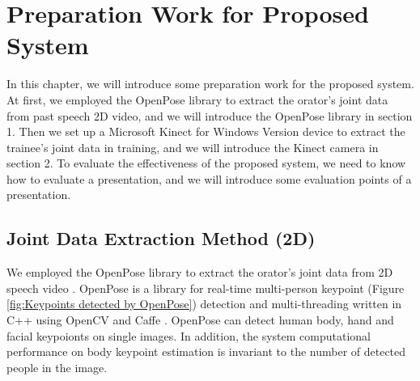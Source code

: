 \chapter{Preparation Work for Proposed System}
\label{chapter:preparation}

\par In this chapter, we will introduce some preparation work for the proposed system. At first, we employed the OpenPose library \cite{cao2017realtime} to extract the orator's joint data from past speech 2D video, and we will introduce the OpenPose library in section 1. Then we set up a Microsoft Kinect for Windows Version device \cite{Shotton2011} to extract the trainee's joint data in training, and we will introduce the Kinect camera in section 2. To evaluate the effectiveness of the proposed system, we need to know how to evaluate a presentation, and we will introduce some evaluation points of a presentation.

\section{Joint Data Extraction Method (2D)}
We employed the OpenPose library to extract the orator's joint data from 2D speech video \cite{cao2017realtime}. OpenPose is a library for real-time multi-person keypoint (Figure \ref{fig:Keypoints detected by OpenPose}) detection and multi-threading written in C++ using OpenCV and Caffe \cite{Jia2014}. OpenPose can detect human body, hand and facial keypoionts on single images. In addition, the system computational performance on body keypoint estimation is invariant to the number of detected people in the image.

